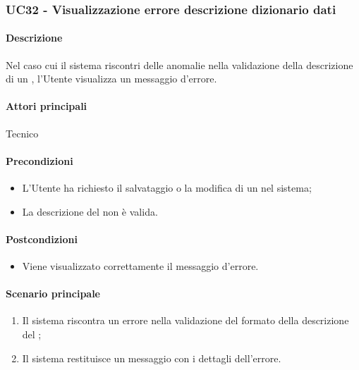 \subsubsection{UC32 - Visualizzazione errore descrizione dizionario dati}\label{UC32}
\paragraph*{Descrizione}
Nel caso cui il sistema riscontri delle anomalie nella validazione della descrizione di un , l'Utente visualizza un messaggio d'errore.

\paragraph*{Attori principali}
Tecnico

\paragraph*{Precondizioni}
\begin{itemize}
  \item L'Utente ha richiesto il salvataggio o la modifica di un  nel sistema;
  \item La descrizione del  non è valida.
\end{itemize}

\paragraph*{Postcondizioni}
\begin{itemize}
  \item Viene visualizzato correttamente il messaggio d'errore.
\end{itemize}

\paragraph*{Scenario principale}
\begin{enumerate}
  \item Il sistema riscontra un errore nella validazione del formato della descrizione del ;
  \item Il sistema restituisce un messaggio con i dettagli dell'errore.  
\end{enumerate}